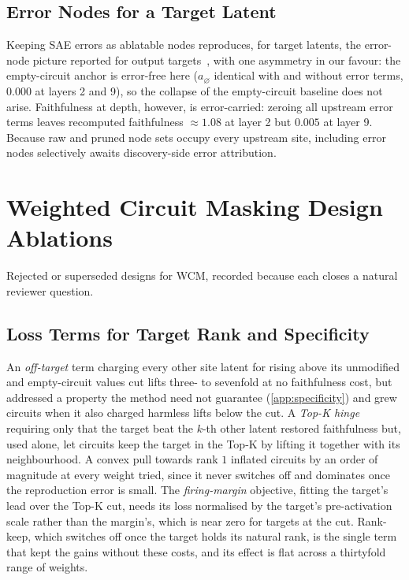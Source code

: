 \documentclass[10pt]{article}
\begin{document}
\subsection{Error Nodes for a Target Latent}
Keeping SAE errors as ablatable nodes reproduces, for target latents, the error-node picture reported for output targets~\citep{marks2025sparse}, with one asymmetry in our favour: the empty-circuit anchor is error-free here ($a_{\varnothing}$ identical with and without error terms, $0.000$ at layers 2 and 9), so the collapse of the empty-circuit baseline does not arise.
Faithfulness at depth, however, is error-carried: zeroing all upstream error terms leaves recomputed faithfulness ${\approx}1.08$ at layer 2 but $0.005$ at layer 9.
Because raw and pruned node sets occupy every upstream site, including error nodes selectively awaits discovery-side error attribution.

\section{Weighted Circuit Masking Design Ablations}
\label{app:membership-studies}
Rejected or superseded designs for WCM, recorded because each closes a natural reviewer question.

\subsection{Loss Terms for Target Rank and Specificity}
\label{app:rank-designs}
An \emph{off-target} term charging every other site latent for rising above its unmodified and empty-circuit values cut lifts three- to sevenfold at no faithfulness cost, but addressed a property the method need not guarantee (\cref{app:specificity}) and grew circuits when it also charged harmless lifts below the cut.
A \emph{Top-K hinge} requiring only that the target beat the $k$-th other latent restored faithfulness but, used alone, let circuits keep the target in the Top-K by lifting it together with its neighbourhood.
A convex pull towards rank $1$ inflated circuits by an order of magnitude at every weight tried, since it never switches off and dominates once the reproduction error is small.
The \emph{firing-margin} objective, fitting the target's lead over the Top-K cut, needs its loss normalised by the target's pre-activation scale rather than the margin's, which is near zero for targets at the cut.
Rank-keep, which switches off once the target holds its natural rank, is the single term that kept the gains without these costs, and its effect is flat across a thirtyfold range of weights.
\end{document}
